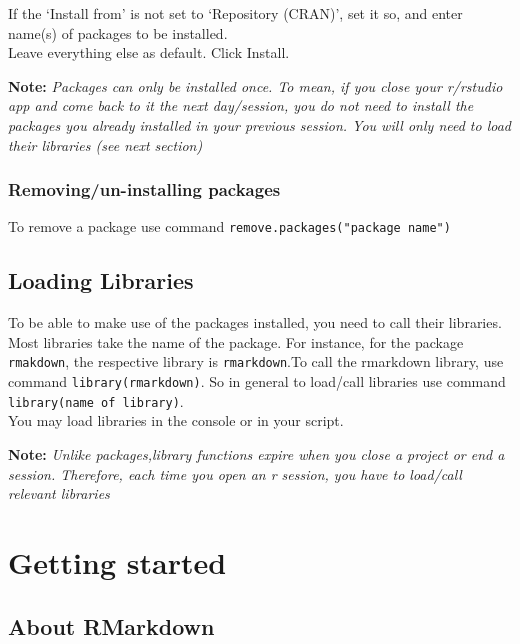 \documentclass[
]{book}
\begin{document}
If the `Install from' is not set to `Repository (CRAN)', set it so, and enter name(s) of packages to be installed.\\
Leave everything else as default. Click Install.

\textbf{Note:} \emph{Packages can only be installed once. To mean, if you close your r/rstudio app and come back to it the next day/session, you do not need to install the packages you already installed in your previous session. You will only need to load their libraries (see next section)}

\hypertarget{removingun-installing-packages}{%
\subsection{Removing/un-installing packages}\label{removingun-installing-packages}}

To remove a package use command \texttt{remove.packages("package\ name")}

\hypertarget{loading-libraries}{%
\section{Loading Libraries}\label{loading-libraries}}

To be able to make use of the packages installed, you need to call their libraries. Most libraries take the name of the package. For instance, for the package \texttt{rmakdown}, the respective library is \texttt{rmarkdown}.To call the rmarkdown library, use command \texttt{library(rmarkdown)}.
So in general to load/call libraries use command \texttt{library(name\ of\ library)}.\\
You may load libraries in the console or in your script.

\textbf{Note:} \emph{Unlike packages,library functions expire when you close a project or end a session. Therefore, each time you open an r session, you have to load/call relevant libraries}

\hypertarget{getting-started}{%
\chapter{Getting started}\label{getting-started}}

\hypertarget{about-rmarkdown}{%
\section{About RMarkdown}\label{about-rmarkdown}}
\end{document}

